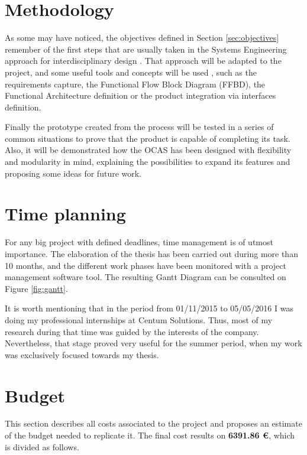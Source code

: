\section{Methodology}

As some may have noticed, the objectives defined in Section \ref{sec:objectives} remember of the first steps that are usually taken in the Systems Engineering approach for interdisciplinary design \cite{whatissystemsengineering}.
That approach will be adapted to the project, and some useful tools and concepts will be used \cite{nationalaeronauticsandspaceadministration2007}, such as the requirements capture, the Functional Flow Block Diagram (FFBD), the Functional Architecture definition or the product integration via interfaces definition.

Finally the prototype created from the process will be tested in a series of common situations to prove that the product is capable of completing its task.
Also, it will be demonstrated how the OCAS has been designed with flexibility and modularity in mind, explaining the possibilities to expand its features and proposing some ideas for future work.

\section{Time planning}

For any big project with defined deadlines, time management is of utmost importance.
The elaboration of the thesis has been carried out during more than 10 months, and the different work phases have been monitored with a project management software tool.
The resulting Gantt Diagram can be consulted on Figure \ref{fig:gantt}.



It is worth mentioning that in the period from 01/11/2015 to 05/05/2016 I was doing my professional internships at Centum Solutions.
Thus, most of my research during that time was guided by the interests of the company.
Nevertheless, that stage proved very useful for the summer period, when my work was exclusively focused towards my thesis.

\section{Budget}

This section describes all costs associated to the project and proposes an estimate
of the budget needed to replicate it. The final cost results on \textbf{6391.86 \euro}, which is divided as follows.

